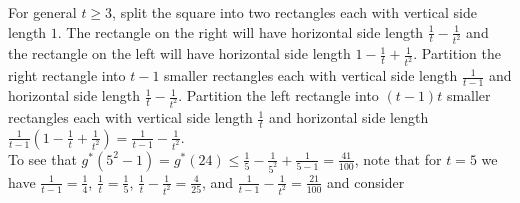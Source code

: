 \documentclass{article}
\begin{document}
For general $t \geq 3$, split the square into two rectangles each with vertical side length $1$. The rectangle on the right will have horizontal side length $\frac{1}{t} - \frac{1}{t^2}$ and the rectangle on the left will have horizontal side length $1-\frac{1}{t}+\frac{1}{t^2}$. Partition the right rectangle into $t-1$ smaller rectangles each with vertical side length $\frac{1}{t-1}$ and horizontal side length $\frac{1}{t} - \frac{1}{t^2}$. Partition the left rectangle into $(t-1)t$ smaller rectangles each with vertical side length $\frac{1}{t}$ and horizontal side length $\frac{1}{t-1}(1-\frac{1}{t}+\frac{1}{t^2}) = \frac{1}{t-1} - \frac{1}{t^2}$. \\

To see that $g^*(5^2-1) = g^*(24) \leq \frac{1}{5}-\frac{1}{5^2}+\frac{1}{5-1} = \frac{41}{100}$, note that for $t = 5$ we have $\frac{1}{t-1} = \frac{1}{4}$, $\frac{1}{t} = \frac{1}{5}$, $\frac{1}{t} - \frac{1}{t^2} = \frac{4}{25}$, and $\frac{1}{t-1}-\frac{1}{t^2} = \frac{21}{100}$ and consider \\
\end{document}
